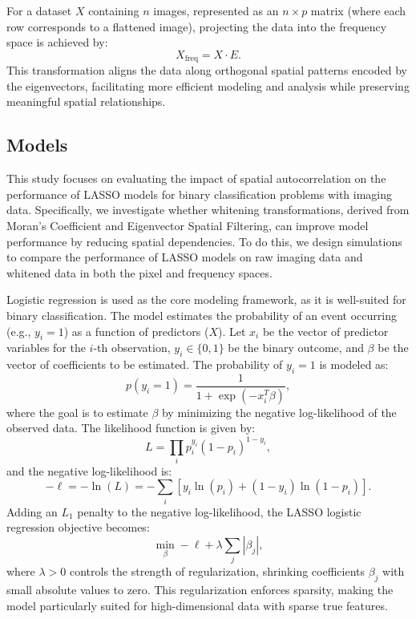 \documentclass[12pt]{article}
\begin{document}
For a dataset \( X \) containing \( n \) images, represented as an \( n \times p \) matrix (where each row corresponds to a flattened image), projecting the data into the frequency space is achieved by:
\[
  X_{\text{freq}} = X \cdot E.
\]
This transformation aligns the data along orthogonal spatial patterns encoded by the eigenvectors, facilitating more efficient modeling and analysis while preserving meaningful spatial relationships.



\subsection{Models}

This study focuses on evaluating the impact of spatial autocorrelation on the performance of LASSO models for binary classification problems with imaging data. Specifically, we investigate whether whitening transformations, derived from Moran’s Coefficient and Eigenvector Spatial Filtering, can improve model performance by reducing spatial dependencies. To do this, we design simulations to compare the performance of LASSO models on raw imaging data and whitened data in both the pixel and frequency spaces.

Logistic regression is used as the core modeling framework, as it is well-suited for binary classification. The model estimates the probability of an event occurring (e.g., \( y_i = 1 \)) as a function of predictors (\( X \)). Let \( x_i \) be the vector of predictor variables for the \( i \)-th observation, \( y_i \in \{0, 1\} \) be the binary outcome, and \( \beta \) be the vector of coefficients to be estimated. The probability of \( y_i = 1 \) is modeled as:
\[
  p(y_i = 1) = \frac{1}{1 + \exp(-x_i^T \beta)},
\]
where the goal is to estimate \( \beta \) by minimizing the negative log-likelihood of the observed data. The likelihood function is given by:
\[
  L = \prod_i p_i^{y_i} (1 - p_i)^{1 - y_i},
\]
and the negative log-likelihood is:
\[
  - \ell = - \ln(L) = - \sum_i \left[ y_i \ln(p_i) + (1 - y_i) \ln(1 - p_i) \right].
\]
Adding an \( L_1 \) penalty to the negative log-likelihood, the LASSO logistic regression objective becomes:
\[
  \min_{\beta} - \ell + \lambda \sum_j |\beta_j|,
\]
where \( \lambda > 0 \) controls the strength of regularization, shrinking coefficients \( \beta_j \) with small absolute values to zero. This regularization enforces sparsity, making the model particularly suited for high-dimensional data with sparse true features.
\end{document}
